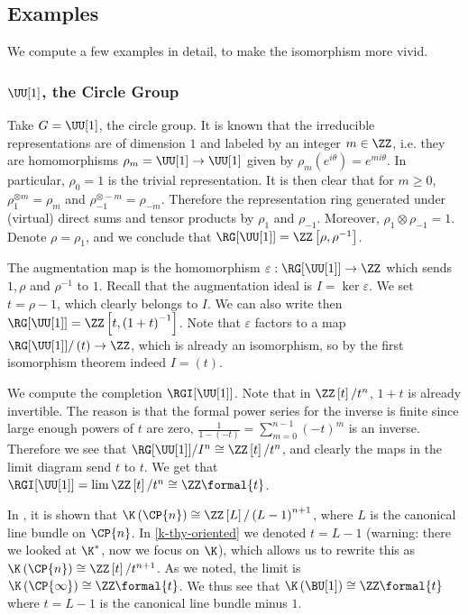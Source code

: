 \subsection{Examples}

We compute a few examples in detail, to make the isomorphism more vivid.

\subsubsection{\texorpdfstring{$\UU[1]$}{U(1)}, the Circle Group}

Take $G = \UU[1]$, the circle group.
It is known that the irreducible representations are of dimension $1$ and labeled by an integer $m \in \ZZ$, i.e. they are homomorphisms $\rho_m = \UU[1] \to \UU[1]$ given by $\rho_m\left(e^{i \theta}\right) = e^{m i \theta}$.
In particular, $\rho_0 = 1$ is the trivial representation.
It is then clear that for $m \geq 0$, $\rho_1^{\otimes m} = \rho_m$ and $\rho_{-1}^{\otimes -m} = \rho_{-m}$.
Therefore the representation ring generated under (virtual) direct sums and tensor products by $\rho_1$ and $\rho_{-1}$.
Moreover, $\rho_1 \otimes \rho_{-1} = 1$.
Denote $\rho = \rho_1$, and we conclude that $\RG[\UU[1]] = \ZZ\left[\rho, \rho^{-1}\right]$.

The augmentation map is the homomorphism $\varepsilon: \RG[\UU[1]] \to \ZZ$ which sends $1,\rho$ and $\rho^{-1}$ to $1$.
Recall that the augmentation ideal is $I = \ker \varepsilon$.
We set $t = \rho-1$, which clearly belongs to $I$.
We can also write then $\RG[\UU[1]] = \ZZ\left[t, \left(1+t\right)^{-1}\right]$.
Note that $\varepsilon$ factors to a map $\RG[\UU[1]]/\left(t\right) \to \ZZ$, which is already an isomorphism, so by the first isomorphism theorem indeed $I = \left(t\right)$.

We compute the completion $\RGI[{\UU[1]}]$.
Note that in $\ZZ\left[t\right]/t^n$, $1+t$ is already invertible.
The reason is that the formal power series for the inverse is finite since large enough powers of $t$ are zero, $\frac{1}{1-\left(-t\right)} = \sum_{m=0}^{n-1} \left(-t\right)^m$ is an inverse.
Therefore we see that $\RG[\UU[1]]/I^n \cong \ZZ\left[t\right]/t^n$, and clearly the maps in the limit diagram send $t$ to $t$.
We get that $\RGI[{\UU[1]}] = \lim \ZZ\left[t\right]/t^n \cong \ZZ\formal{t}$.

In \cite[proposition 2.24]{VB}, it is shown that $\K\left(\CP{n}\right) \cong \ZZ\left[L\right] / \left(L-1\right)^{n+1}$, where $L$ is the canonical line bundle on $\CP{n}$.
In \ref{k-thy-oriented} we denoted $t = L-1$ (warning: there we looked at $\K^*$, now we focus on $\K$), which allows us to rewrite this as $\K\left(\CP{n}\right) \cong \ZZ\left[t\right] / t^{n+1}$.
As we noted, the limit is $\K\left(\CP{\infty}\right) \cong \ZZ\formal{t}$.
We thus see that $\K\left(\BU[1]\right) \cong \ZZ\formal{t}$ where $t = L - 1$ is the canonical line bundle minus $1$.

